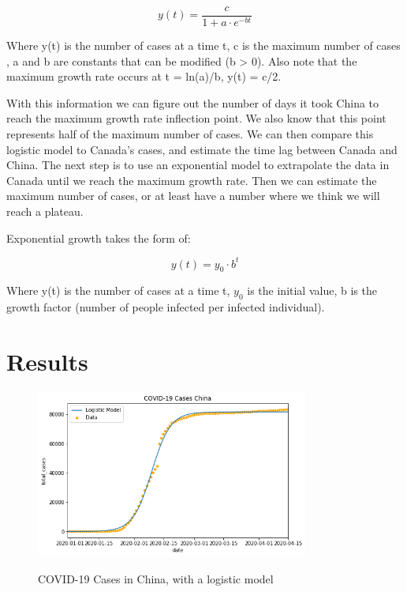 \documentclass[12pt,a4paper]{article}
\begin{document}
\begin{equation} \label{eq:1}
y(t) = \frac{c}{1 + a \cdot e^{-bt}}
\end{equation}

Where y(t) is the number of cases at a time t, c is the maximum number of cases , a and b are constants that can be modified (b > 0). Also note that the maximum growth rate occurs at t = ln(a)/b, y(t) = c/2.

With this information we can figure out the number of days it took China to reach the maximum growth rate inflection point. We also know that this point represents half of the maximum number of cases. We can then compare this logistic model to Canada's cases, and estimate the time lag between Canada and China. The next step is to use an exponential model to extrapolate the data in Canada until we reach the maximum growth rate. Then we can estimate the maximum number of cases, or at least have a number where we think we will reach a plateau.

Exponential growth takes the form of:

\begin{equation} \label{eq:2}
y(t) = y_0 \cdot b^t
\end{equation}

Where y(t) is the number of cases at a time t, $y_0$ is the initial value, b is the growth factor (number of people infected per infected individual).

\section*{Results}
\begin{figure}[h]
    \centering
    \caption{COVID-19 Cases in China, with a logistic model}
    \includegraphics[width=0.8\textwidth]{plot1}
    \label{fig:1}
\end{figure}
\end{document}
